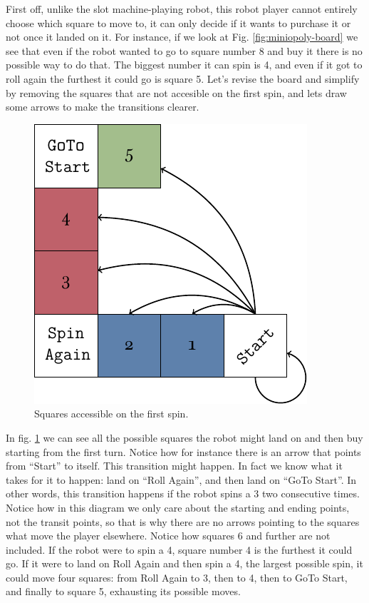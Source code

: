 First off, unlike the slot machine-playing robot, this robot 
player cannot entirely choose which square to move to, it can 
only decide if it wants to purchase it or not once it landed on 
it.  For instance, if we look at Fig. \ref{fig:miniopoly-board} 
we see that even if the robot wanted to go to square number 8 
and buy it there is no possible way to do that. The biggest 
number it can spin is 4, and even if it got to roll again the 
furthest it could go is square 5. Let's revise the board and 
simplify by removing the squares that are not accesible on the 
first spin, and lets draw some arrows to make the transitions 
clearer.

\begin{figure}[h]
	\centering
	\includegraphics[width=.75\textwidth]{img/diagram-start.pdf}
	\caption{Squares accessible on the first spin.}
	\label{fig:miniopoly-diagram-start}
\end{figure}

In fig. \ref{fig:miniopoly-diagram-start} we can see all the 
possible squares the robot might land on and then buy starting 
from the first turn. Notice how for instance there is an arrow 
that points from ``Start'' to itself. This transition might 
happen. In fact we know what it takes for it to happen: land on 
``Roll Again'', and then land on ``GoTo Start''. In other 
words, this transition happens if the robot spins a 3 two 
consecutive times. Notice how in this diagram we only care 
about the starting and ending points, not the transit points, 
so that is why there are no arrows pointing to the squares what 
move the player elsewhere. Notice how squares 6 and further are 
not included. If the robot were to spin a 4, square number 4 is 
the furthest it could go. If it were to land on Roll Again and 
then spin a 4, the largest possible spin, it could move four 
squares: from Roll Again to 3, then to 4, then to GoTo Start, 
and finally to square 5, exhausting its possible moves.


